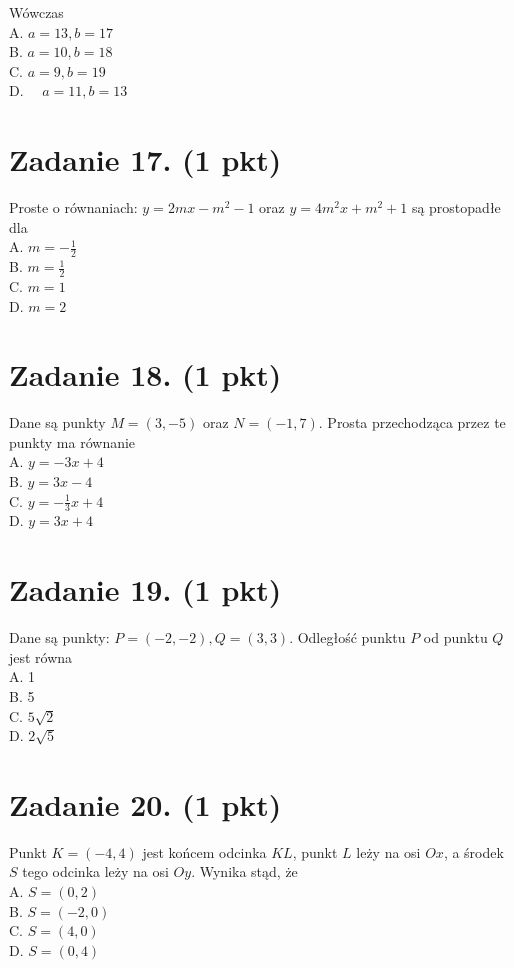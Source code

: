 \documentclass[10pt]{article}
\begin{document}
Wówczas\\
A. \(a=13, b=17\)\\
B. \(a=10, b=18\)\\
C. \(a=9, b=19\)\\
D. \(\quad a=11, b=13\)

\section*{Zadanie 17. (1 pkt)}
Proste o równaniach: \(y=2 m x-m^{2}-1\) oraz \(y=4 m^{2} x+m^{2}+1\) są prostopadłe dla\\
A. \(m=-\frac{1}{2}\)\\
B. \(m=\frac{1}{2}\)\\
C. \(m=1\)\\
D. \(m=2\)

\section*{Zadanie 18. (1 pkt)}
Dane są punkty \(M=(3,-5)\) oraz \(N=(-1,7)\). Prosta przechodząca przez te punkty ma równanie\\
A. \(y=-3 x+4\)\\
B. \(y=3 x-4\)\\
C. \(y=-\frac{1}{3} x+4\)\\
D. \(y=3 x+4\)

\section*{Zadanie 19. (1 pkt)}
Dane są punkty: \(P=(-2,-2), Q=(3,3)\). Odległość punktu \(P\) od punktu \(Q\) jest równa\\
A. 1\\
B. 5\\
C. \(5 \sqrt{2}\)\\
D. \(2 \sqrt{5}\)

\section*{Zadanie 20. (1 pkt)}
Punkt \(K=(-4,4)\) jest końcem odcinka \(K L\), punkt \(L\) leży na osi \(O x\), a środek \(S\) tego odcinka leży na osi \(O y\). Wynika stąd, że\\
A. \(S=(0,2)\)\\
B. \(S=(-2,0)\)\\
C. \(S=(4,0)\)\\
D. \(S=(0,4)\)
\end{document}
